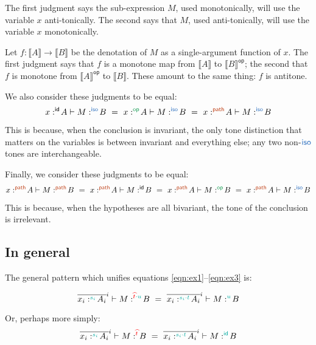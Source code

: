 \documentclass{article}
\newcommand{\ms}[1]{\ensuremath{\mathsf{#1}}}
\newcommand{\den}[1]{\llbracket{#1}\rrbracket}
\newcommand{\op}{\ms{op}}
\newcommand{\iso}{\ms{iso}}
\renewcommand{\path}{\ms{path}}
\newcommand{\tm}{{\ms{id}}}     %
\newcommand{\ta}{{\color{ForestGreen}\ensuremath{\op}}}    %
\newcommand{\ti}{{\color{NavyBlue}\ensuremath{\iso}}} %
\newcommand{\tb}{{\color{Bittersweet}\ensuremath{\path}}}  %
\newcommand{\tc}{\cdot}         %
\newcommand{\h}[3]{#1 :^{#3}\! {#2}}
\newcommand{\hm}[2]{\h{#1}{#2}{\tm}}
\newcommand{\ha}[2]{\h{#1}{#2}{\ta}}
\newcommand{\hi}[2]{\h{#1}{#2}{\ti}}
\newcommand{\hb}[2]{\h{#1}{#2}{\tb}}
\begin{document}
The first judgment says the sub-expression $M$, used monotonically, will use the
variable $x$ anti-tonically. The second says that $M$, used anti-tonically, will
use the variable $x$ monotonically.

Let $f : \den{A} \to \den{B}$ be the denotation of $M$ as a single-argument
function of $x$. The first judgment says that $f$ is a monotone map from
$\den{A}$ to $\den{B}^{\op}$; the second that $f$ is monotone from
$\den{A}^{\op}$ to $\den{B}$. These amount to the same thing: $f$ is
antitone.

We also consider these judgments to be equal:
\begin{equation}
  \hm{x}{A} \vdash \hi{M}{B}
  ~=~
  \ha{x}{A} \vdash \hi{M}{B}
  ~=~
  \hb{x}{A} \vdash \hi{M}{B}
\end{equation}

This is because, when the conclusion is invariant, the only tone distinction
that matters on the variables is between invariant and everything else; any two
non-$\ti$ tones are interchangeable.

Finally, we consider these judgments to be equal:
\begin{equation} \label{eqn:ex3}
  \hb{x}{A} \vdash \hb{M}{B}
  ~=~
  \hb{x}{A} \vdash \hm{M}{B}
  ~=~
  \hb{x}{A} \vdash \ha{M}{B}
  ~=~
  \hb{x}{A} \vdash \hi{M}{B}
\end{equation}

This is because, when the hypotheses are all bivariant, the tone of the
conclusion is irrelevant.

\subsection{In general}
The general pattern which unifies equations \ref{eqn:ex1}--\ref{eqn:ex3} is:

\newcommand{\tdual}[1]{{\color{red}{\widehat{#1}}}}

\begin{equation}
  \overline{\h{x_i}{A_i}{\hilited s_i}}^i \vdash \h{M}{B}{\hilited \tdual{t} \tc u}
  ~=~
  \overline{\h{x_i}{A_i}{\hilited s_i \tc t}}^i
  \vdash \h{M}{B}{\hilited u}
\end{equation}

Or, perhaps more simply:
\begin{equation}
  \overline{\h{x_i}{A_i}{\hilited s_i}}^i \vdash \h{M}{B}{\hilited \tdual{t}}
  ~=~
  \overline{\h{x_i}{A_i}{\hilited s_i \tc t}}^i
  \vdash \h{M}{B}{\hilited\tm}
\end{equation}
\end{document}
